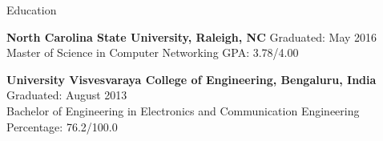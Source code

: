 \documentclass{resume} %
\begin{document}

\begin{rSection}{Education}

    \begin{rSubsectionEducation}
        {\bf North Carolina State University, Raleigh, NC} \hfill {Graduated: May 2016} \\ 
        Master of Science in Computer Networking \hfill {GPA: 3.78/4.00}
        \begin{comment}
            \\Course Work: Internet Protocols, Introduction to Operating Systems, Introduction to Algorithms,\\
            \hphantom{Course Work: }Network Design and Management, Routed Network Design and Management,\\
            \hphantom{Course Work: }High Performance Cloud Service
        \end{comment}
    \end{rSubsectionEducation}
    
    \begin{rSubsectionEducation}
        {\bf University Visvesvaraya College of Engineering, Bengaluru, India} \hfill { Graduated: August 2013} \\ 
        Bachelor of Engineering in Electronics and Communication Engineering \hfill {Percentage: 76.2/100.0}
    \end{rSubsectionEducation}

\end{rSection}
\end{document}
